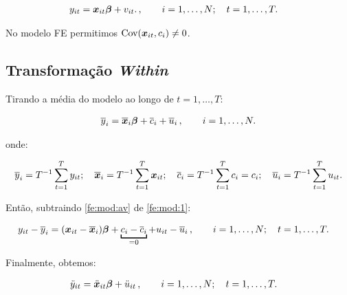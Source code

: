 \documentclass[11pt, oneside, a4paper, article]{article}
\numberwithin{equation}{section}
\begin{document}
\vspace{-1 em}
\begin{align}\label{fe:mod:2}
	y_{it} &= \boldsymbol{x}_{it} \boldsymbol{\beta} + v_{it}.
	\, , \qquad	i = 1, \dots, N; \quad t = 1, \dots, T.
\end{align}

\noindent
No modelo FE permitimos $\text{Cov}(\boldsymbol{x}_{it}, c_{i} ) \neq 0$.

\subsection{Transformação \textit{Within}}

Tirando a média do modelo ao longo de 
$t = 1, \dots, T$:

\vspace{-1 em}
\begin{align} \label{fe:mod:av} %
	\overline{y}_{i} = 
	\overline{\xvec}_{i} \betavec + \overline{c}_{i} + \overline{u}_{i} 
	\, , \qquad	i = 1, \dots, N.
\end{align}

\noindent
onde:

\vspace{-1 em}
\begin{align*}
	\overline{y}_{i} = T^{-1} \sum_{t=1}^{T} y_{it};
	\quad
	\overline{\boldsymbol{x}}_{i} = T^{-1} \sum_{t=1}^{T} \boldsymbol{x}_{it};
	\quad
	\overline{c}_{i} = T^{-1} \sum_{t=1}^{T} c_{i} = c_{i};
	\quad
	\overline{u}_{i} = T^{-1} \sum_{t=1}^{T} u_{it}.
\end{align*}

Então, subtraindo \eqref{fe:mod:av} de \eqref{fe:mod:1}:

\vspace{-1 em}
\begin{align*} %
	y_{it} - \overline{y}_{i} &=
	(\xvec_{it} - \overline{\xvec}_{i}) \betavec +
	\underbracket[1pt]{c_{i} - \overline{c}_{i}}_{=0} +
	u_{it} - \overline{u}_{i} 
	\, , \qquad	i = 1, \dots, N; \quad t = 1, \dots, T.
\end{align*}

\noindent
Finalmente, obtemos:

\vspace{-1 em}
\begin{align} \label{fe:ddot}
	\ddot{y}_{it} &= \ddot{\boldsymbol{x}}_{it} \boldsymbol{\beta} + \ddot{u}_{it} 
	\, , \qquad	i = 1, \dots, N; \quad t = 1, \dots, T.
\end{align}
\end{document}
